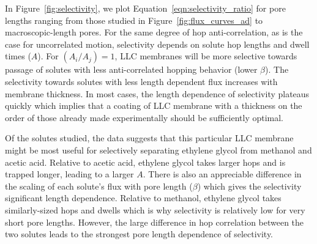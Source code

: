 \documentclass[aps,pre,preprint,groupedaddress]{revtex4-2}
\begin{document}
  In Figure~\ref{fig:selectivity}, we plot Equation~\ref{eqn:selectivity_ratio} for pore
  lengths ranging from those studied in Figure~\ref{fig:flux_curves_ad} to macroscopic-length
  pores. For the same degree of hop anti-correlation, as is the case for uncorrelated motion, 
  selectivity depends on solute hop lengths and dwell times ($A$). For $(A_i / A_j)=1$, LLC
  membranes will be more selective towards passage of solutes with less anti-correlated hopping
  behavior (lower $\beta$). The selectivity towards solutes with less length dependent flux
  increases with membrane thickness. In most cases, the length dependence of selectivity 
  plateaus quickly which implies that a coating of LLC membrane with a thickness on the 
  order of those already made experimentally should be sufficiently 
  optimal. 

  Of the solutes studied, the data suggests that this particular LLC membrane 
  might be most useful for selectively separating ethylene glycol from methanol
  and acetic acid. Relative to acetic acid, ethylene glycol takes larger hops 
  and is trapped longer, leading to a larger $A$. There is also an appreciable 
  difference in the scaling of each solute's flux with pore length ($\beta$) 
  which gives the selectivity significant length dependence. Relative to methanol,
  ethylene glycol takes similarly-sized hops and dwells which is why selectivity
  is relatively low for very short pore lengths. However, the large difference in
  hop correlation between the two solutes leads to the strongest pore length 
  dependence of selectivity. 
  
\end{document}
